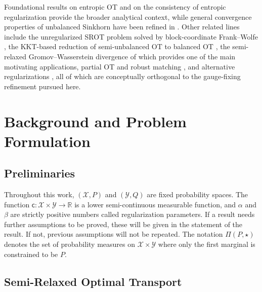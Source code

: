 \documentclass{article}
\begin{document}
Foundational results on entropic OT \cite{cuturi2013sinkhorndistanceslightspeedcomputation, altschuler2017nearlinear, computationaloptitranbsoort} and on the consistency of entropic regularization \cite{carlier2017convergence, pal2024difference} provide the broader analytical context, while general convergence properties of unbalanced Sinkhorn have been refined in \cite{pham2020unbalanced, nguyen2023unbalanced}. Other related lines include the unregularized SROT problem solved by block-coordinate Frank--Wolfe \cite{fukunaga2021blockcoordinate}, the KKT-based reduction of semi-unbalanced OT to balanced OT \cite{liu2025equivalent}, the semi-relaxed Gromov--Wasserstein divergence of \cite{vincentcuaz2022semirelaxed} which provides one of the main motivating applications, partial OT and robust matching \cite{ibm2024partial, truong2026accelerated, yoon2026conditional, mignon2025semiunbalanced}, and alternative regularizations \cite{blondel2018smoothsparseoptimaltransport, tang2024sinkhorn, pele2009fast}, all of which are conceptually orthogonal to the gauge-fixing refinement pursued here.
\section{Background and Problem Formulation}
\subsection{Preliminaries}
Throughout this work, $(\mathcal{X},P)$ and $(\mathcal{Y},Q)$ are fixed probability spaces. The function $\mathsf{c}: \mathcal X \times \mathcal Y \to \mathbb{R}$ is a lower semi-continuous measurable function, and $\alpha$ and $\beta$ are strictly positive numbers called regularization parameters. If a result needs further assumptions to be proved, these will be given in the statement of the result. If not, previous assumptions will not be repeated. The notation $\Pi(P, \star)$ denotes the set of probability measures on $\mathcal{X} \times \mathcal{Y}$ where only the first marginal is constrained to be $P$.









\subsection{Semi-Relaxed Optimal Transport}
\end{document}
